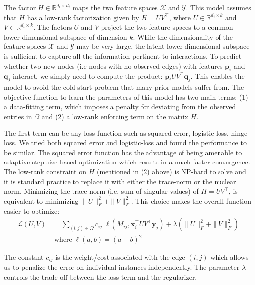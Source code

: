 \documentclass[runningheads,a4paper]{llncs}
\begin{document}
The factor $H \in \mathbb{R}^{d_t \times d_t}$ maps the two feature spaces $\mathcal{X}$ and $\mathcal{Y}$. This model assumes that $H$ has a low-rank factorization given by $H = U V^\intercal$, where $U \in \mathbb{R}^{d_t \times k}$ and $V \in \mathbb{R}^{d_t \times k}$. The factors $U$ and $V$ project the two feature spaces to a common lower-dimensional subspace of dimension $k$. While the dimensionality of the feature spaces $\mathcal{X}$ and $\mathcal{Y}$ may be very large, the latent lower dimensional subspace is sufficient to capture all the information pertinent to interactions. To predict whether two new nodes (i.e nodes with no observed edges) with features $\mathbf{p}_i$ and $\mathbf{q}_j$ interact, we simply need to compute the product: $\mathbf{p}_i U V^\intercal \mathbf{q}_j$. This enables the model to avoid the cold start problem that many prior models suffer from. The objective function to learn the parameters of this model has two main terms: (1) a data-fitting term, which imposes a penalty for deviating from the observed entries in $\Omega$ and (2) a low-rank enforcing term on the matrix $H$. 

The first term can be any loss function such as squared error, logistic-loss, hinge loss. We tried both squared error and logistic-loss and found the performance to be similar. The squared error function has the advantage of being amenable to adaptive step-size based optimization which results in a much faster convergence. The low-rank constraint on $H$ (mentioned in (2) above) is NP-hard to solve and it is standard practice to replace it with either the trace-norm or the nuclear norm. Minimizing the trace norm (i.e. sum of singular values) of $H = UV^\intercal$, is equivalent to minimizing $\|U\|^2_F + \|V\|^2_F$. This choice makes the overall function easier to optimize:
\begin{equation}
\label{objective}
\begin{array}{ll}
\mathcal{L}(U,V) & =\displaystyle{\sum_{(i,j) \in \Omega}} c_{ij} \; \ell(M_{ij}, \mathbf{x}_i^\intercal U V^\intercal \mathbf{y}_j) + \lambda ( \|U\|^2_F + \|V\|^2_F ) \\
& \textrm{ where } \ell(a, b) = (a - b)^2
\end{array}
\end{equation}

The constant $c_{ij}$ is the weight/cost associated with the edge $(i,j)$ which allows us to penalize the error on individual instances independently. The parameter $\lambda$ controls the trade-off between the loss term and the regularizer. 
\end{document}
